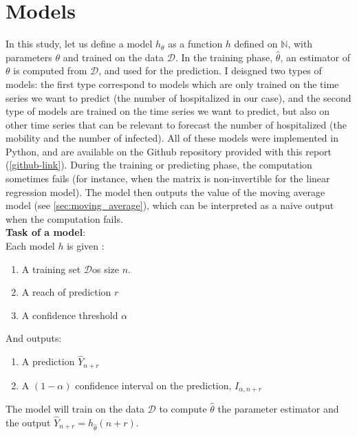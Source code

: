 \section{Models}



In this study, let us define a model ${h}_{\theta }$ as a function ${h}$  defined on $ \mathbb{N}$, with parameters $\theta$ and trained on the data $\mathcal{D}$.
In the training phase, $\hat{\theta}$,  an estimator of $\theta$ is computed from $\mathcal{D}$, and used for the prediction.  
I deisgned two types of models: the first type correspond to models which are only trained on the time series we want to predict (the number of hospitalized in our case), and the second type of models are trained on the time series we want to predict, but also on other time series that can be relevant to forecast the number of hospitalized (the mobility and the number of infected). 
All of these models were implemented in Python, and are available on the Github repository provided with this report (\ref{github-link}).
During the training or predicting phase, the computation sometimes fails (for instance, when the matrix is non-invertible for the linear regression model). 
The model then outputs the value of the moving average model (see \ref{sec:moving_average}), which can be interpreted as a naive output when the computation fails. \\[0.3cm]
\textbf{Task of a model}: \\

Each model ${h}$ is given : 

\begin{enumerate}
    \item A training set $\mathcal{D}$os size $n$. 
    \item A reach of prediction $r$
    \item A confidence threshold $\alpha$
\end{enumerate}


And outputs: 

\begin{enumerate}
    \item A prediction $\hat{Y}_{n+r}$
    \item A $(1-\alpha)$ confidence interval on the prediction, $I_{\alpha, n+r}$
\end{enumerate}

The model will train on the data $\mathcal{D}$ to compute $\hat{\theta}$ the parameter estimator and the output $\hat{Y}_{n+r} = {h}_{\hat{\theta}}(n+r)$.


